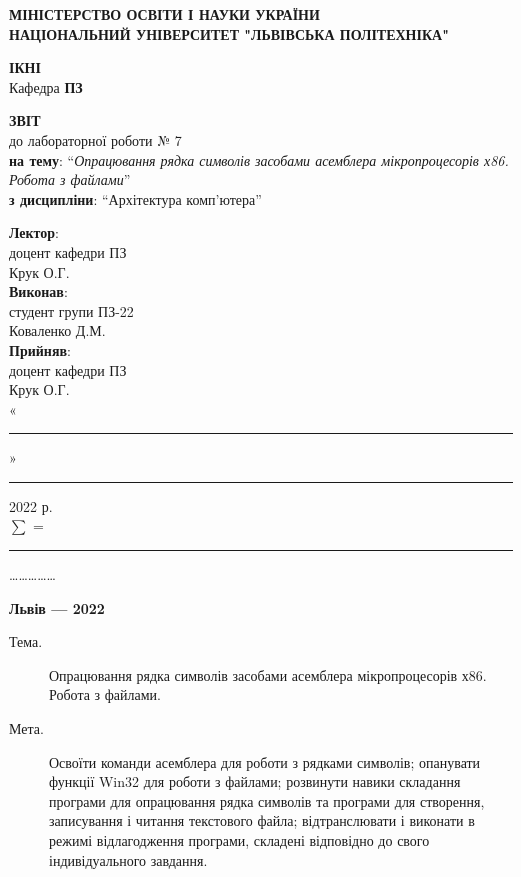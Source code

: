 \documentclass{article}
\newcommand\subject{Архітектура комп'ютера}
\newcommand\lecturer{доцент кафедри ПЗ\\Крук О.Г.}
\newcommand\teacher{доцент кафедри ПЗ\\Крук О.Г.}
\newcommand\mygroup{ПЗ-22}
\newcommand\lab{7}
\newcommand\theme{Опрацювання рядка символів засобами асемблера мікропроцесорів х86. Робота з файлами}
\newcommand\purpose{Освоїти команди асемблера для роботи з рядками символів; опанувати функції Win32 для роботи з файлами; розвинути навики складання програми для опрацювання рядка символів та програми для створення, записування і читання текстового файла; відтранслювати і виконати в режимі відлагодження програми, складені відповідно до свого індивідуального завдання}
\begin{document}
\begin{normalsize}
	\begin{titlepage}
		\thispagestyle{empty}
		\begin{center}
			\textbf{МІНІСТЕРСТВО ОСВІТИ І НАУКИ УКРАЇНИ\\
				НАЦІОНАЛЬНИЙ УНІВЕРСИТЕТ "ЛЬВІВСЬКА ПОЛІТЕХНІКА"}
		\end{center}
		\begin{flushright}
			\textbf{ІКНІ}\\
			Кафедра \textbf{ПЗ}
		\end{flushright}
		\vspace{200pt}
		\begin{center}
			\textbf{ЗВІТ}\\
			\vspace{10pt}
			до лабораторної роботи № \lab\\
			\textbf{на тему}: “\textit{\theme}”\\
			\textbf{з дисципліни}: “\subject”
		\end{center}
		\vspace{112pt}
		\begin{flushright}
			
			\textbf{Лектор}:\\
			\lecturer\\
			\vspace{28pt}
			\textbf{Виконав}:\\
			
			студент групи \mygroup\\
			Коваленко Д.М.\\
			\vspace{28pt}
			\textbf{Прийняв}:\\
			
			\teacher\\
			
			\vspace{28pt}
			«\rule{1cm}{0.15mm}» \rule{1.5cm}{0.15mm} 2022 р.\\
			$\sum$ = \rule{1cm}{0.15mm}……………\\
			
		\end{flushright}
		\vspace{\fill}
		\begin{center}
			\textbf{Львів — 2022}
		\end{center}
	\end{titlepage}
		
	\begin{description}
		\item[Тема.] \theme.
		\item[Мета.] \purpose.
	\end{description}


\end{normalsize}
\end{document}

